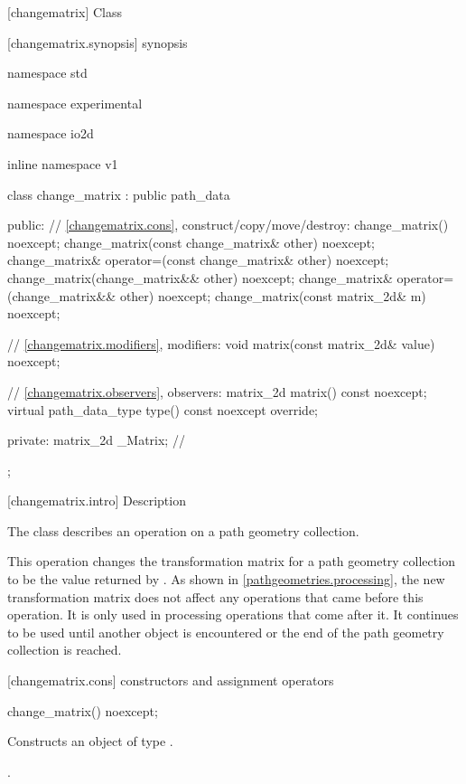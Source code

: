  [changematrix] {Class }

 [changematrix.synopsis] { synopsis}

\begin{codeblock}
namespace std { namespace experimental { namespace io2d { inline namespace v1 {
  class change_matrix : public path_data {
  public:
    // \ref{changematrix.cons}, construct/copy/move/destroy:
    change_matrix() noexcept;
    change_matrix(const change_matrix& other) noexcept;
    change_matrix& operator=(const change_matrix& other) noexcept;
    change_matrix(change_matrix&& other) noexcept;
    change_matrix& operator=(change_matrix&& other) noexcept;
    change_matrix(const matrix_2d& m) noexcept;

    // \ref{changematrix.modifiers}, modifiers:
    void matrix(const matrix_2d& value) noexcept;

    // \ref{changematrix.observers}, observers:
    matrix_2d matrix() const noexcept;
    virtual path_data_type type() const noexcept override;
    
  private:
    matrix_2d _Matrix; // \expos
  };
} } } }
\end{codeblock}

 [changematrix.intro] { Description}

\pnum
{}
The class  describes an operation on a path geometry collection.

\pnum
This operation changes the transformation matrix for a path geometry collection to be the value returned by . As shown in \ref{pathgeometries.processing}, the new transformation matrix does not affect any operations that came before this operation. It is only used in processing operations that come after it. It continues to be used until another  object is encountered or the end of the path geometry collection is reached.

 [changematrix.cons] { constructors and assignment operators}

\begin{itemdecl}
    change_matrix() noexcept;
\end{itemdecl}
\begin{itemdescr}
	\pnum
	\effects
	Constructs an object of type .
	
	\pnum
	\postconditions
	.
\end{itemdescr}

